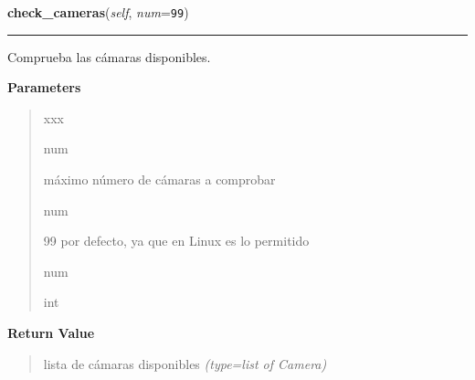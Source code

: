 \hspace{.8\funcindent}\begin{boxedminipage}{\funcwidth}

    \raggedright \textbf{check\_cameras}(\textit{self}, \textit{num}={\tt 99})

    \vspace{-1.5ex}

    \rule{\textwidth}{0.5\fboxrule}
\setlength{\parskip}{2ex}
Comprueba las cámaras disponibles.

\setlength{\parskip}{1ex}
      \textbf{Parameters}
      \vspace{-1ex}

      \begin{quote}
        \begin{Ventry}{xxx}

          \item[num]


máximo número de cámaras a comprobar
          \item[num]


99 por defecto, ya que en Linux es lo permitido
          \item[num]


int
        \end{Ventry}

      \end{quote}

      \textbf{Return Value}
    \vspace{-1ex}

      \begin{quote}

lista de cámaras disponibles
      {\it (type=list of Camera)}

      \end{quote}

    \end{boxedminipage}

    \label{src:cameras:Cameras:show_and_select_camera}

    \vspace{0.5ex}

